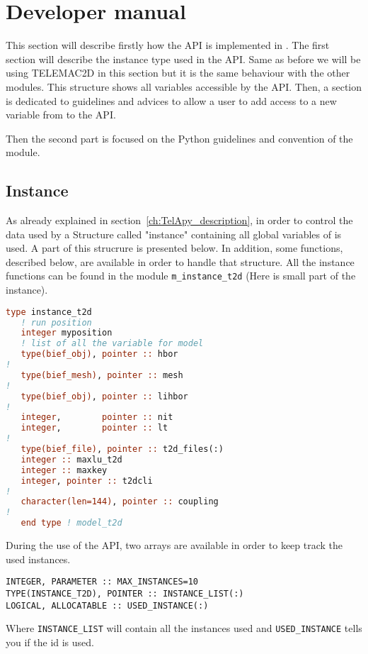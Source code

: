 \chapter{Developer manual}
\label{ch:hydrod:sim}

This section will describe firstly how the API is implemented in \fortran.  The
first section will describe the instance type used in the API\@. Same as before
we will be using TELEMAC{2D} in this section but it is the same behaviour with
the other modules. This structure shows all variables accessible by the
\fortran API\@. Then, a section is dedicated to guidelines and advices to allow
a user to add access to a new variable from  to the API\@.

Then the second part is focused on the Python guidelines and convention
of the \TelApy{} module.
%
\section{Instance}
%
As already explained in section~\ref{ch:TelApy_description}, in order to
control the data used by  a \fortran Structure called "instance"
containing all global variables of  is used. A part of this
strucrure is presented below.  In addition, some functions, described below,
are available in order to handle that structure. All the instance functions can
be found in the \fortran module \verb!m_instance_t2d! (Here is small part of the instance).

\begin{lstlisting}[language=Fortran]
type instance_t2d
   ! run position
   integer myposition
   ! list of all the variable for model
   type(bief_obj), pointer :: hbor
!
   type(bief_mesh), pointer :: mesh
!
   type(bief_obj), pointer :: lihbor
!
   integer,        pointer :: nit
   integer,        pointer :: lt
!
   type(bief_file), pointer :: t2d_files(:)
   integer :: maxlu_t2d
   integer :: maxkey
   integer, pointer :: t2dcli
!
   character(len=144), pointer :: coupling
!
   end type ! model_t2d
\end{lstlisting}

During the use of the API, two arrays are available in order to keep track the
used instances.
\begin{lstlisting}
INTEGER, PARAMETER :: MAX_INSTANCES=10
TYPE(INSTANCE_T2D), POINTER :: INSTANCE_LIST(:)
LOGICAL, ALLOCATABLE :: USED_INSTANCE(:)
\end{lstlisting}

Where \verb!INSTANCE_LIST! will contain all the instances used and
\verb!USED_INSTANCE! tells you if the id is used.

